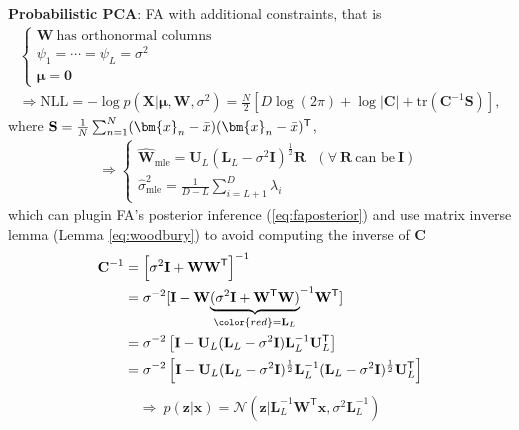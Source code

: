 \textbf{Probabilistic PCA}: FA with additional constraints, that is
\begin{gather}
    \begin{cases}
    \mathbf{W}~\text{has orthonormal columns} \\
    \psi_{1} = \cdots = \psi_{L} = \sigma^2 \\
    \bm{\mu} = \mathbf{0}
    \end{cases} \\
    \Rightarrow
    \mathrm{NLL} = - \log p(\mathbf{X}|\bm{\mu},\mathbf{W},\sigma^2) = \frac{N}{2}\left[
        D\log (2\pi) + \log |\mathbf{C}| + \mathrm{tr}(\mathbf{C}^{-1}\mathbf{S})
    \right],
\end{gather}
where $\mathbf{S} = \frac{1}{N} \sum_{n=1}^N(\bm{x}_n - \Bar{x})(\bm{x}_n - \Bar{x})^\mathsf{T}$,
\begin{gather}
    \Rightarrow \begin{cases}
        \hat{\mathbf{W}}_\text{mle} = \mathbf{U}_L(\mathbf{L}_L - \sigma^2\mathbf{I})^\frac{1}{2}\mathbf{R}~~~(\forall~\mathbf{R}~\text{can be}~\mathbf{I}) \\
        \hat{\sigma}^2_\text{mle} = \frac{1}{D - L}\sum_{i=L+1}^D \lambda_i
    \end{cases}
\end{gather}
which can plugin FA's posterior inference (\ref{eq:faposterior}) and 
use matrix inverse lemma (Lemma \ref{eq:woodbury}) to avoid computing the inverse of $\mathbf{C}$
\begin{align}
    \mathbf{C}^{-1} 
    & = \left[
        \sigma^2\mathbf{I} + \mathbf{WW}^\mathsf{T}
    \right]^{-1} \\
    & = \sigma^{-2}[\mathbf{I}-\mathbf{W}{\underbrace{(\sigma^2\mathbf{I} + \mathbf{W}^\mathsf{T}\mathbf{W})}_{\color{red}=\mathbf{L}_L}}^{-1}\mathbf{W}^\mathsf{T}] \\
    & = \sigma^{-2}\left[
        \mathbf{I} - \mathbf{U}_L(\mathbf{L}_L-\sigma^2\mathbf{I})\mathbf{L}_L^{-1}\mathbf{U}_L^\mathsf{T}
    \right] \\
    & = \sigma^{-2}\left[
        \mathbf{I} - \mathbf{U}_L(\mathbf{L}_L-\sigma^2\mathbf{I})^\frac{1}{2}\mathbf{L}_L^{-1}(\mathbf{L}_L - \sigma^2\mathbf{I})^\frac{1}{2}\mathbf{U}_L^\mathsf{T}
    \right]
\end{align}
\begin{gather}
    \Rightarrow ~\boxed{p(\bm{z}|\bm{x})
    = \mathcal{N}(\bm{z}|\mathbf{L}_L^{-1}\mathbf{W}^\mathsf{T}\bm{x}, \sigma^2\mathbf{L}_L^{-1})
    }
\end{gather}

